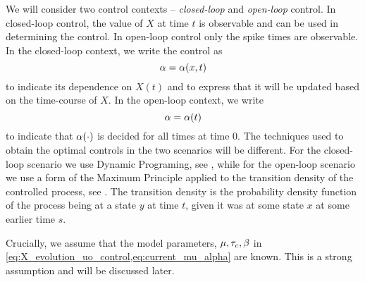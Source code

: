 We will consider two control contexts -- {\sl closed-loop} and  {\sl open-loop}
control. In closed-loop control, the value of $X$ at time $t$ is observable and
can be used in determining the control. In open-loop control only the spike
times are observable. In the closed-loop context, we write the control as $$\alpha =
\alpha(x,t)$$ to indicate its dependence on $X(t)$ and to express that it will be
updated based on the time-course of $X$. In the open-loop context, we write $$\alpha
= \alpha(t)$$ to indicate that $\alpha(\cdot)$ is decided for all times at time 0. The
techniques used to obtain the optimal controls in the two scenarios will be
different. For the closed-loop scenario we use Dynamic Programing, see
\cite{Fleming1975}, while for the open-loop scenario we use a form of the
Maximum Principle applied to the transition density of the controlled process,
see \cite{Borzi2012}. The transition density is the probability density function
of the process being at a state $y$ at time $t$, given it was at some state $x$
at some earlier time $s$.

Crucially, we assume that the model parameters, ${\mu },\tau_c,\beta$ in
\cref{eq:X_evolution_uo_control,eq:current_mu_alpha} are known. This is a strong assumption and will be
discussed later. 

